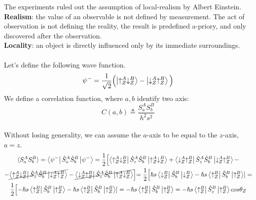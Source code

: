 \documentclass{article}
\begin{document}
The experiments ruled out the assumption of local-realism by Albert Einstein.
 \\ \textbf{Realism}: the value of an observable is not defined by measurement. The act of observation is not defining the reality, the result is predefined a-priory, and only discovered after the observation.
 \\ \textbf{Locality}: an object is directly influenced only by its immediate surroundings.  \\ \\
 Let's define the following wave function.
$$\psi^- = \frac{1}{\sqrt{2}} \Bigl( \ket{\uparrow^A_Z \downarrow^B_Z} - \ket{\downarrow^A_Z \uparrow^B_Z} \Bigl)$$
We define a correlation function, where $a,b$ identify two axis:
$$C(a,b) \triangleq \frac{S_a^A S_b^B}{h^2s^2}$$ \\
Without losing generality, we can assume the  $a$-axis to be equal to the $z$-axis, $a=z$.
\begin{gather*}
    \langle S_a^AS_b^B \rangle = \bra{\psi^-}\hat{S}_a^A\hat{S}_b^B \ket{\psi^-} = \frac{1}{2} \Bigl[ \bra{\uparrow^A_Z \downarrow^B_Z} \hat{S}_z^A\hat{S}_b^B \ket{\uparrow^A_Z \downarrow^B_Z}  + \bra{\downarrow^A_Z \uparrow^B_Z} \hat{S}_z^A\hat{S}_b^B \ket{\downarrow^A_Z \uparrow^B_Z} - \\  - \cancel{\bra{\uparrow^A_Z \downarrow^B_Z} \hat{S}_z^A\hat{S}_b^B \ket{\downarrow^A_Z \uparrow^B_Z} }-  \cancel{\bra{\downarrow^A_Z \uparrow^B_Z} \hat{S}_z^A\hat{S}_b^B \ket{\uparrow^A_Z \downarrow^B_Z}}  \Bigl] = \frac{1}{2} \Bigl[ \hslash s \bra{\downarrow_Z^B} \hat{S}_b^B \ket{\downarrow_Z^B} - \hslash s \bra{\uparrow_Z^B} \hat{S}_b^B \ket{\uparrow_Z^B} ] = \\ \frac{1}{2} \Bigl[ - \hslash s \bra{\uparrow_Z^B} \hat{S}_b^B \ket{\uparrow_Z^B} - \hslash s \bra{\uparrow_Z^B} \hat{S}_b^B \ket{\uparrow_Z^B} ] = - \hslash s \bra{\uparrow_Z^B} \hat{S}_b^B \ket{\uparrow_Z^B} = - \hslash s \bra{\uparrow_Z^B} \hat{S}_z^B \ket{\uparrow_Z^B}cos\theta_Z
\end{gather*}
\end{document}
